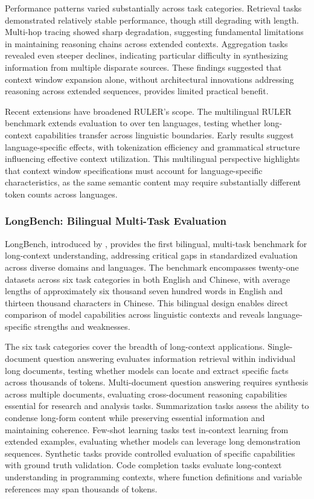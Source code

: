 Performance patterns varied substantially across task categories. Retrieval tasks demonstrated relatively stable performance, though still degrading with length. Multi-hop tracing showed sharp degradation, suggesting fundamental limitations in maintaining reasoning chains across extended contexts. Aggregation tasks revealed even steeper declines, indicating particular difficulty in synthesizing information from multiple disparate sources. These findings suggested that context window expansion alone, without architectural innovations addressing reasoning across extended sequences, provides limited practical benefit.

Recent extensions have broadened RULER's scope. The multilingual RULER benchmark extends evaluation to over ten languages, testing whether long-context capabilities transfer across linguistic boundaries. Early results suggest language-specific effects, with tokenization efficiency and grammatical structure influencing effective context utilization. This multilingual perspective highlights that context window specifications must account for language-specific characteristics, as the same semantic content may require substantially different token counts across languages.

\subsubsection{LongBench: Bilingual Multi-Task Evaluation}

LongBench, introduced by \citet{bai2024longbench}, provides the first bilingual, multi-task benchmark for long-context understanding, addressing critical gaps in standardized evaluation across diverse domains and languages. The benchmark encompasses twenty-one datasets across six task categories in both English and Chinese, with average lengths of approximately six thousand seven hundred words in English and thirteen thousand characters in Chinese. This bilingual design enables direct comparison of model capabilities across linguistic contexts and reveals language-specific strengths and weaknesses.

The six task categories cover the breadth of long-context applications. Single-document question answering evaluates information retrieval within individual long documents, testing whether models can locate and extract specific facts across thousands of tokens. Multi-document question answering requires synthesis across multiple documents, evaluating cross-document reasoning capabilities essential for research and analysis tasks. Summarization tasks assess the ability to condense long-form content while preserving essential information and maintaining coherence. Few-shot learning tasks test in-context learning from extended examples, evaluating whether models can leverage long demonstration sequences. Synthetic tasks provide controlled evaluation of specific capabilities with ground truth validation. Code completion tasks evaluate long-context understanding in programming contexts, where function definitions and variable references may span thousands of tokens.

